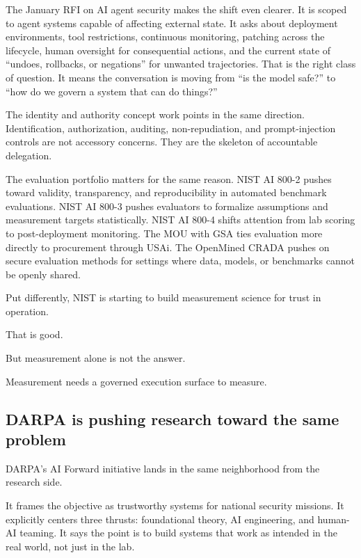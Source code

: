 \documentclass[11pt]{article}
\begin{document}
The January RFI on AI agent security makes the shift even clearer. It is
scoped to agent systems capable of affecting external state. It asks
about deployment environments, tool restrictions, continuous monitoring,
patching across the lifecycle, human oversight for consequential
actions, and the current state of ``undoes, rollbacks, or negations''
for unwanted trajectories. That is the right class of question. It means
the conversation is moving from ``is the model safe?'' to ``how do we
govern a system that can do things?''

The identity and authority concept work points in the same direction.
Identification, authorization, auditing, non-repudiation, and
prompt-injection controls are not accessory concerns. They are the
skeleton of accountable delegation.

The evaluation portfolio matters for the same reason. NIST AI 800-2
pushes toward validity, transparency, and reproducibility in automated
benchmark evaluations. NIST AI 800-3 pushes evaluators to formalize
assumptions and measurement targets statistically. NIST AI 800-4 shifts
attention from lab scoring to post-deployment monitoring. The MOU with
GSA ties evaluation more directly to procurement through USAi. The
OpenMined CRADA pushes on secure evaluation methods for settings where
data, models, or benchmarks cannot be openly shared.

Put differently, NIST is starting to build measurement science for trust
in operation.

That is good.

But measurement alone is not the answer.

Measurement needs a governed execution surface to measure.

\hypertarget{darpa-is-pushing-research-toward-the-same-problem}{%
\subsection{DARPA is pushing research toward the same
problem}\label{darpa-is-pushing-research-toward-the-same-problem}}

DARPA's AI Forward initiative lands in the same neighborhood from the
research side.

It frames the objective as trustworthy systems for national security
missions. It explicitly centers three thrusts: foundational theory, AI
engineering, and human-AI teaming. It says the point is to build systems
that work as intended in the real world, not just in the lab.
\end{document}
